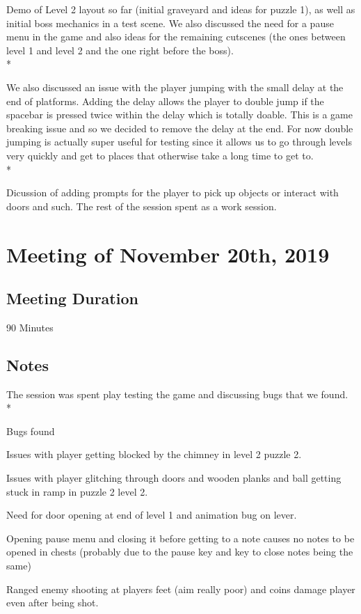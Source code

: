 \documentclass{article}
\begin{document}
Demo of Level 2 layout so far (initial graveyard and ideas for puzzle 1), as well as initial boss mechanics in a test scene. We also discussed the need for a pause menu in the game and also ideas for the remaining cutscenes (the ones between level 1 and level 2 and the one right before the boss).\\*

We also discussed an issue with the player jumping with the small delay at the end of platforms. Adding the delay allows the player to double jump if the spacebar is pressed twice within the delay which is totally doable. This is a game breaking issue and so we decided to remove the delay at the end. For now double jumping is actually super useful for testing since it allows us to go through levels very quickly and get to places that otherwise take a long time to get to.\\*

Dicussion of adding prompts for the player to pick up objects or interact with doors and such.
The rest of the session spent as a work session.

\section{Meeting of November 20th, 2019}

\subsection{Meeting Duration}
90 Minutes

\subsection{Notes}

The session was spent play testing the game and discussing bugs that we found.\\*

Bugs found
\begin{description}
\item Issues with player getting blocked by the chimney in level 2 puzzle 2.
\item Issues with player glitching through doors and wooden planks and ball getting stuck in ramp in puzzle 2 level 2.
\item Need for door opening at end of level 1 and animation bug on lever.
\item Opening pause menu and closing it before getting to a note causes no notes to be opened in chests (probably due to the pause key and key to close notes being the same)
\item Ranged enemy shooting at players feet (aim really poor) and coins damage player even after being shot.
\end{description}
\end{document}
